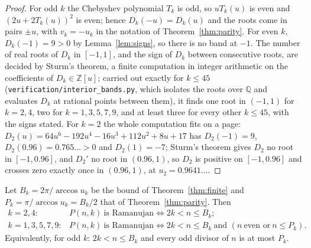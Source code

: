 \begin{proof}
For odd $k$ the Chebyshev polynomial $T_k$ is odd, so $uT_k(u)$ is even and
$(2u+2T_k(u))^2$ is even; hence $D_k(-u)=D_k(u)$ and the roots come in pairs
$\pm u$, with $v_k=-u_k$ in the notation of Theorem~\ref{thm:parity}. For even
$k$, $D_k(-1)=9>0$ by Lemma~\ref{lem:signs}, so there is no band at $-1$. The
number of real roots of $D_k$ in $[-1,1]$, and the sign of $D_k$ between
consecutive roots, are decided by Sturm's theorem, a finite computation in
integer arithmetic on the coefficients of $D_k\in\mathbb Z[u]$; carried out
exactly for $k\le45$ (\texttt{verification/interior\_bands.py}, which isolates
the roots over $\mathbb Q$ and evaluates $D_k$ at rational points between them),
it finds one root in $(-1,1)$ for $k=2,4$, two for $k=1,3,5,7,9$, and at least
three for every other $k\le45$, with the signs stated. For $k=2$ the whole
computation fits on a page: $D_2(u)=64u^6-192u^4-16u^3+112u^2+8u+17$ has
$D_2(-1)=9$, $D_2(0.96)=0.765\ldots>0$ and $D_2(1)=-7$; Sturm's theorem gives
$D_2$ no root in $[-1,0.96]$, and $D_2'$ no root in $(0.96,1)$, so $D_2$ is
positive on $[-1,0.96]$ and crosses zero exactly once in $(0.96,1)$, at
$u_2=0.9641\ldots$.
\end{proof}

\begin{theorem}\label{prop:closedsmall}
Let $B_k=2\pi/\arccos u_k$ be the bound of Theorem~\ref{thm:finite} and
$P_k=\pi/\arccos u_k=B_k/2$ that of Theorem~\ref{thm:parity}. Then
\[
\begin{array}{ll}
  k=2,4: & P(n,k)\ \text{is Ramanujan}\iff 2k<n\le B_k;\\[2pt]
  k=1,3,5,7,9: & P(n,k)\ \text{is Ramanujan}\iff 2k<n\le B_k\ \text{and }
  (n\ \text{even or}\ n\le P_k).
\end{array}
\]
Equivalently, for odd $k$: $2k<n\le B_k$ and every odd divisor of $n$ is at most
$P_k$.
\end{theorem}

